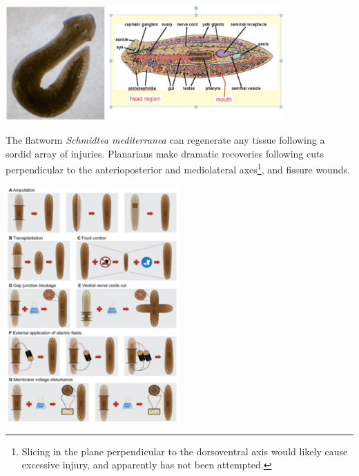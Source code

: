 \documentclass{article}
\begin{document}
\begin{center}
\includegraphics[width=0.8\textwidth]{planaria_anatomy.pdf}
\end{center}

The flatworm \textit{Schmidtea mediterranea} can regenerate any tissue following a sordid array of injuries. Planarians make dramatic recoveries following cuts perpendicular to the anterioposterior and mediolateral axes\footnote{Slicing in the plane perpendicular to the dorsoventral axis would likely cause excessive injury, and apparently has not been attempted.}, and fissure wounds.

\begin{center}
\includegraphics[width=0.5\textwidth]{injuries.pdf}
\end{center}
\end{document}
